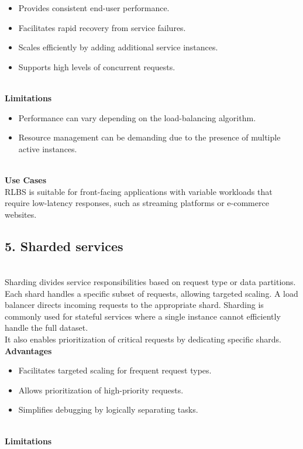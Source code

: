 \begin{itemize}
\item
\protect{}\label{pbXQSWqcE-r_eYYRSUnmC}
Provides consistent end-user performance.
\item
\protect{}\label{q9qazSrAFpWnFbuOr6V8Q}
Facilitates rapid recovery from service failures.
\item
\protect{}\label{R22_yFSZoqip1BMU0Abcu}
Scales efficiently by adding additional service instances.
\item
\protect{}\label{cqN7imd7vMOLYPhlu-FhW}
Supports high levels of concurrent requests.
\end{itemize}
\\
\textbf{Limitations}

\begin{itemize}
\item
\protect{}\label{q-5dR7PxbBr9DjpNmVDEf}
Performance can vary depending on the load-balancing algorithm.
\item
\protect{}\label{CPUp5NhT-sVHr-icwDofJ}
Resource management can be demanding due to the presence of multiple active instances.
\end{itemize}
\\
\textbf{Use Cases}
\\
RLBS is suitable for front-facing applications with variable workloads that require low-latency responses, such as streaming platforms or e-commerce websites.

\subsection{5. Sharded services}\label{JngccRKY_WP5m3aEMay2F}
\\
Sharding divides service responsibilities based on request type or data partitions.
\\
Each shard handles a specific subset of requests, allowing targeted scaling. A load balancer directs incoming requests to the appropriate shard. Sharding is commonly used for stateful services where a single instance cannot efficiently handle the full dataset.
\\
It also enables prioritization of critical requests by dedicating specific shards.
\\
\textbf{Advantages}

\begin{itemize}
\item
\protect{}\label{-kNpPKkGdjQYuDimkLUd_}
Facilitates targeted scaling for frequent request types.
\item
\protect{}\label{Nu_I58O4Ly7gxEqGuiAtZ}
Allows prioritization of high-priority requests.
\item
\protect{}\label{8hfqgQGAjeXvBbxkZBi8K}
Simplifies debugging by logically separating tasks.
\end{itemize}
\\
\textbf{Limitations}

